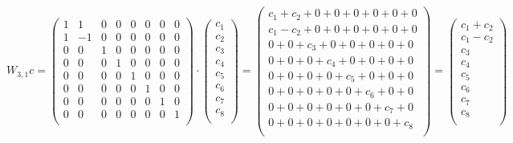 \documentclass[12pt]{article}
\begin{document}
\[
W_{3, 1} c =
\begin{pmatrix}
1  &  1   & 0    &  0   & 0    & 0  &  0  &  0  \\
1  & -1  &  0   &  0   & 0    & 0  &  0  &  0 \\
0   &  0  &  1   &   0   & 0    & 0  &  0  &  0 \\
0   &  0   &  0  &   1 & 0    & 0  &  0  &  0 \\
0   &  0  &  0 & 0 &  1  &  0  & 0    & 0  \\
0   &  0  &  0 & 0 &  0  &  1  &  0   & 0  \\
0   &  0  &  0 & 0 &  0  &  0  &  1   & 0  \\
0   &  0  &  0 & 0 &  0  &  0  & 0    & 1  \\
\end{pmatrix}
\cdot 
\begin{pmatrix}
c_1 \\
c_2 \\
c_3 \\
c_4 \\
c_5 \\
c_6 \\
c_7 \\
c_8 \\
\end{pmatrix}
=
\begin{pmatrix}
c_1 + c_2 + 0 + 0 + 0 + 0 + 0 +0 \\
c_1 - c_2 + 0 + 0 + 0 + 0 + 0 +0 \\
0 + 0+ c_3 + 0 + 0 + 0 + 0 +0 \\
0 + 0 + 0 + c_4 + 0 + 0 + 0 +0 \\
0 + 0 + 0 + 0 + c_5 + 0 + 0 + 0  \\
0 + 0 + 0 + 0 + 0 + c_6 + 0 + 0 \\
0 + 0 + 0 + 0 + 0 + 0 + c_7 + 0 \\
0 + 0 + 0 + 0 + 0 + 0 + 0 + c_8 \\
\end{pmatrix}
=
\begin{pmatrix}
c_1 + c_2 \\
c_1 - c_2 \\
c_3 \\
c_4 \\
c_5 \\
c_6 \\
c_7 \\
c_8 \\
\end{pmatrix}
\]
\\
\end{document}
